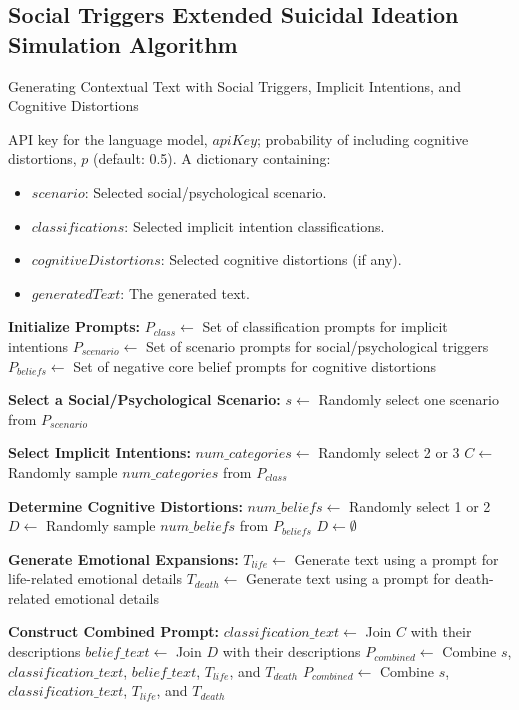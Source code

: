 \subsection{Social Triggers Extended Suicidal Ideation Simulation Algorithm}
\label{app:alg2}

\begin{algorithm*}[h]
\caption{Generating Contextual Text with Social Triggers, Implicit Intentions, and Cognitive Distortions}
\label{alg:text_generation_social}
\begin{algorithmic}[1]
\Require API key for the language model, $apiKey$; probability of including cognitive distortions, $p$ (default: 0.5).
\Ensure A dictionary containing:
\begin{itemize}
    \item $scenario$: Selected social/psychological scenario.
    \item $classifications$: Selected implicit intention classifications.
    \item $cognitiveDistortions$: Selected cognitive distortions (if any).
    \item $generatedText$: The generated text.
\end{itemize}

\State \textbf{Initialize Prompts:}
\State $P_{class} \gets$ Set of classification prompts for implicit intentions
\State $P_{scenario} \gets$ Set of scenario prompts for social/psychological triggers
\State $P_{beliefs} \gets$ Set of negative core belief prompts for cognitive distortions

\State \textbf{Select a Social/Psychological Scenario:}
\State $s \gets$ Randomly select one scenario from $P_{scenario}$

\State \textbf{Select Implicit Intentions:}
\State $num\_categories \gets$ Randomly select 2 or 3
\State $C \gets$ Randomly sample $num\_categories$ from $P_{class}$

\State \textbf{Determine Cognitive Distortions:}
    \State $num\_beliefs \gets$ Randomly select 1 or 2
    \State $D \gets$ Randomly sample $num\_beliefs$ from $P_{beliefs}$
\Else
    \State $D \gets \emptyset$
\EndIf

\State \textbf{Generate Emotional Expansions:}
\State $T_{life} \gets$ Generate text using a prompt for life-related emotional details
\State $T_{death} \gets$ Generate text using a prompt for death-related emotional details

\State \textbf{Construct Combined Prompt:}
\State $classification\_text \gets$ Join $C$ with their descriptions
    \State $belief\_text \gets$ Join $D$ with their descriptions
    \State $P_{combined} \gets$ Combine $s$, $classification\_text$, $belief\_text$, $T_{life}$, and $T_{death}$
\Else
    \State $P_{combined} \gets$ Combine $s$, $classification\_text$, $T_{life}$, and $T_{death}$
\EndIf


\end{algorithmic}
\end{algorithm*}

